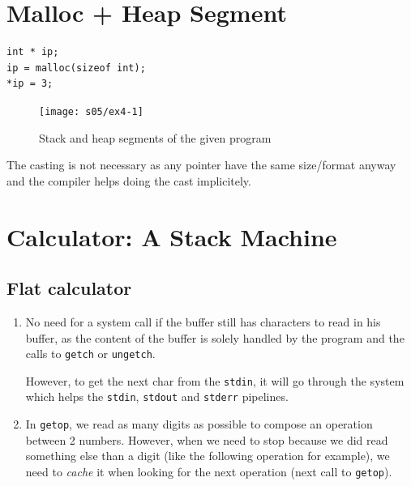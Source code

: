 %
%
\bigskip
\bigskip
\section{Malloc + Heap Segment}



\begin{lstlisting}
int * ip;
ip = malloc(sizeof int);
*ip = 3;
\end{lstlisting}


\begin{figure}[H]
    \center
    \texttt{[image: s05/ex4-1]}
    \caption{Stack and heap segments of the given program\label{fig:ex4-1}}
\end{figure}


\pagebreak
{}

The casting is not necessary as any pointer have the same size/format anyway and the compiler helps doing the cast implicitely.



%
%
\bigskip
\bigskip
\section{Calculator: A Stack Machine}


\subsection{Flat calculator}


\begin{enumerate}
    \item No need for a system call if the buffer still has characters to read in his buffer, as the content of the buffer is solely handled by the program and the calls to \verb!getch! or \verb!ungetch!.

    However, to get the next char from the \verb!stdin!, it will go through the system which helps the \verb!stdin!, \verb!stdout! and \verb!stderr! pipelines.

    \item In \verb!getop!, we read as many digits as possible to compose an operation between 2 numbers. However, when we need to stop because we did read something else than a digit (like the following operation for example), we need to \emph{cache} it when looking for the next operation (next call to \verb!getop!).
\end{enumerate}


